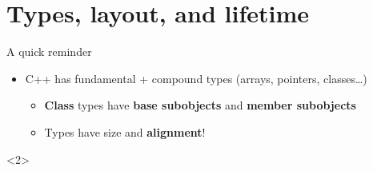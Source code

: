 \section{Types, layout, and lifetime}

\begin{frame}{A quick reminder}
  \begin{itemize}
    \itemsep=1em
  \item C++ has fundamental + compound types (arrays, pointers, classes\ldots)
    \begin{itemize}
      \itemsep=1ex
    \item {\bfseries Class} types have {\bfseries base subobjects} and {\bfseries member subobjects}
      \begin{center}
        
      \end{center}

    \item Types have size and {\bfseries alignment}!
    \end{itemize}
  \end{itemize}

  \begin{onlyenv}<2>
  \end{onlyenv}
\end{frame}

